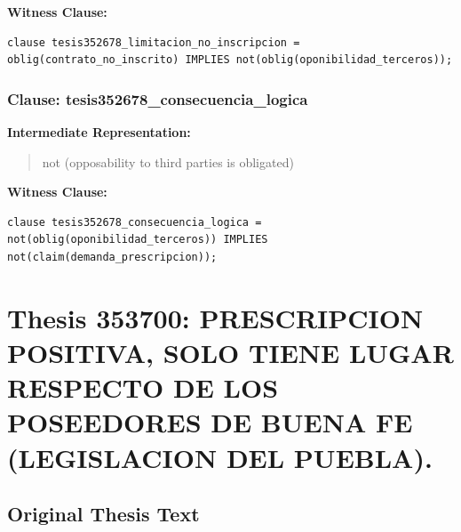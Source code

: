 \documentclass[11pt,a4paper]{article}
\begin{document}
\textbf{Witness Clause:}

\begin{lstlisting}[style=witnessstyle, language=Witness]
clause tesis352678_limitacion_no_inscripcion = oblig(contrato_no_inscrito) IMPLIES not(oblig(oponibilidad_terceros));
\end{lstlisting}

\subsubsection{Clause: tesis352678\_consecuencia\_logica}

\textbf{Intermediate Representation:}

\begin{quote}
not (opposability to third parties is obligated)
\end{quote}

\textbf{Witness Clause:}

\begin{lstlisting}[style=witnessstyle, language=Witness]
clause tesis352678_consecuencia_logica = not(oblig(oponibilidad_terceros)) IMPLIES not(claim(demanda_prescripcion));
\end{lstlisting}

\newpage

\section{Thesis 353700: PRESCRIPCION POSITIVA, SOLO TIENE LUGAR RESPECTO DE LOS POSEEDORES DE BUENA FE (LEGISLACION DEL PUEBLA).}
\label{thesis:353700}

\subsection{Original Thesis Text}
\end{document}
